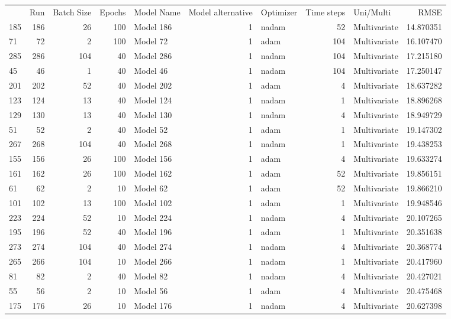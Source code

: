 \begin{tabular}{lrrrlrlrlr}
 & Run & Batch Size & Epochs & Model Name & Model alternative & Optimizer & Time steps & Uni/Multi & RMSE \\
185 & 186 & 26 & 100 & Model 186 & 1 & nadam & 52 & Multivariate & 14.870351 \\
71 & 72 & 2 & 100 & Model 72 & 1 & adam & 104 & Multivariate & 16.107470 \\
285 & 286 & 104 & 40 & Model 286 & 1 & nadam & 104 & Multivariate & 17.215180 \\
45 & 46 & 1 & 40 & Model 46 & 1 & nadam & 104 & Multivariate & 17.250147 \\
201 & 202 & 52 & 40 & Model 202 & 1 & adam & 4 & Multivariate & 18.637282 \\
123 & 124 & 13 & 40 & Model 124 & 1 & nadam & 1 & Multivariate & 18.896268 \\
129 & 130 & 13 & 40 & Model 130 & 1 & nadam & 4 & Multivariate & 18.949729 \\
51 & 52 & 2 & 40 & Model 52 & 1 & adam & 1 & Multivariate & 19.147302 \\
267 & 268 & 104 & 40 & Model 268 & 1 & nadam & 1 & Multivariate & 19.438253 \\
155 & 156 & 26 & 100 & Model 156 & 1 & adam & 4 & Multivariate & 19.633274 \\
161 & 162 & 26 & 100 & Model 162 & 1 & adam & 52 & Multivariate & 19.856151 \\
61 & 62 & 2 & 10 & Model 62 & 1 & adam & 52 & Multivariate & 19.866210 \\
101 & 102 & 13 & 100 & Model 102 & 1 & adam & 1 & Multivariate & 19.948546 \\
223 & 224 & 52 & 10 & Model 224 & 1 & nadam & 4 & Multivariate & 20.107265 \\
195 & 196 & 52 & 40 & Model 196 & 1 & adam & 1 & Multivariate & 20.351638 \\
273 & 274 & 104 & 40 & Model 274 & 1 & nadam & 4 & Multivariate & 20.368774 \\
265 & 266 & 104 & 10 & Model 266 & 1 & nadam & 1 & Multivariate & 20.417960 \\
81 & 82 & 2 & 40 & Model 82 & 1 & nadam & 4 & Multivariate & 20.427021 \\
55 & 56 & 2 & 10 & Model 56 & 1 & adam & 4 & Multivariate & 20.475468 \\
175 & 176 & 26 & 10 & Model 176 & 1 & nadam & 4 & Multivariate & 20.627398 \\
\end{tabular}
